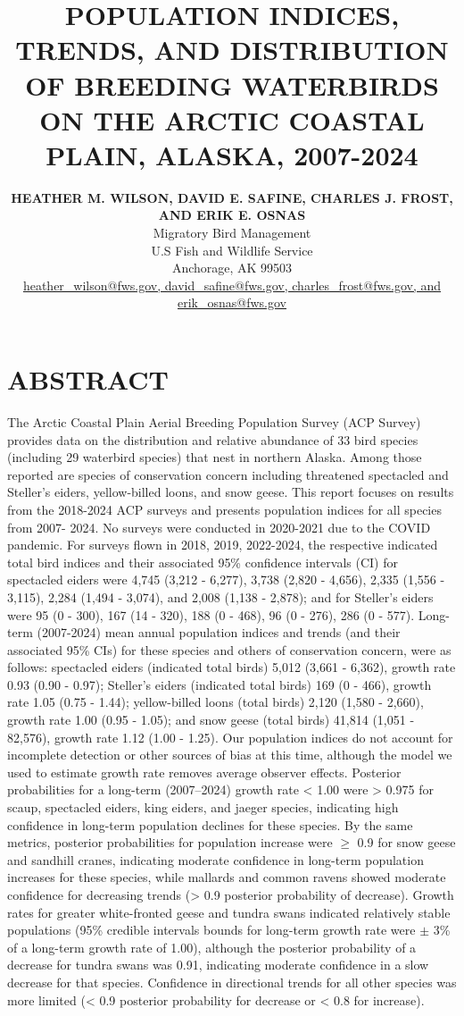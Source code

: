 \documentclass[
]{article}
\title{POPULATION INDICES, TRENDS, AND DISTRIBUTION OF BREEDING
WATERBIRDS ON THE ARCTIC COASTAL PLAIN, ALASKA, 2007-2024}
\author{\textbf{HEATHER M. WILSON, DAVID E. SAFINE, CHARLES J. FROST,
AND ERIK E. OSNAS}\\Migratory Bird Management\\U.S Fish and Wildlife
Service\\Anchorage, AK 99503\\\href{mailto:heather\_wilson@fws.gov,
david\_safine@fws.gov, charles\_frost@fws.gov, and
erik\_osnas@fws.gov}{heather\_wilson@fws.gov, david\_safine@fws.gov,
charles\_frost@fws.gov, and erik\_osnas@fws.gov}}
\date{}
\begin{document}
\maketitle


\section*{ABSTRACT}\label{abstract}

The Arctic Coastal Plain Aerial Breeding Population Survey (ACP Survey)
provides data on the distribution and relative abundance of 33 bird
species (including 29 waterbird species) that nest in northern Alaska.
Among those reported are species of conservation concern including
threatened spectacled and Steller's eiders, yellow-billed loons, and
snow geese. This report focuses on results from the 2018-2024 ACP
surveys and presents population indices for all species from 2007- 2024.
No surveys were conducted in 2020-2021 due to the COVID pandemic. For
surveys flown in 2018, 2019, 2022-2024, the respective indicated total
bird indices and their associated 95\% confidence intervals (CI) for
spectacled eiders were 4,745 (3,212 - 6,277), 3,738 (2,820 - 4,656),
2,335 (1,556 - 3,115), 2,284 (1,494 - 3,074), and 2,008 (1,138 - 2,878);
and for Steller's eiders were 95 (0 - 300), 167 (14 - 320), 188 (0 -
468), 96 (0 - 276), 286 (0 - 577). Long-term (2007-2024) mean annual
population indices and trends (and their associated 95\% CIs) for these
species and others of conservation concern, were as follows: spectacled
eiders (indicated total birds) 5,012 (3,661 - 6,362), growth rate 0.93
(0.90 - 0.97); Steller's eiders (indicated total birds) 169 (0 - 466),
growth rate 1.05 (0.75 - 1.44); yellow-billed loons (total birds) 2,120
(1,580 - 2,660), growth rate 1.00 (0.95 - 1.05); and snow geese (total
birds) 41,814 (1,051 - 82,576), growth rate 1.12 (1.00 - 1.25). Our
population indices do not account for incomplete detection or other
sources of bias at this time, although the model we used to estimate
growth rate removes average observer effects. Posterior probabilities
for a long-term (2007--2024) growth rate \textless{} 1.00 were
\textgreater{} 0.975 for scaup, spectacled eiders, king eiders, and
jaeger species, indicating high confidence in long-term population
declines for these species. By the same metrics, posterior probabilities
for population increase were \(\geq\) 0.9 for snow geese and sandhill
cranes, indicating moderate confidence in long-term population increases
for these species, while mallards and common ravens showed moderate
confidence for decreasing trends (\textgreater{} 0.9 posterior
probability of decrease). Growth rates for greater white-fronted geese
and tundra swans indicated relatively stable populations (95\% credible
intervals bounds for long-term growth rate were \(\pm\) 3\% of a
long-term growth rate of 1.00), although the posterior probability of a
decrease for tundra swans was 0.91, indicating moderate confidence in a
slow decrease for that species. Confidence in directional trends for all
other species was more limited (\textless{} 0.9 posterior probability
for decrease or \textless{} 0.8 for increase). \newline
\end{document}
